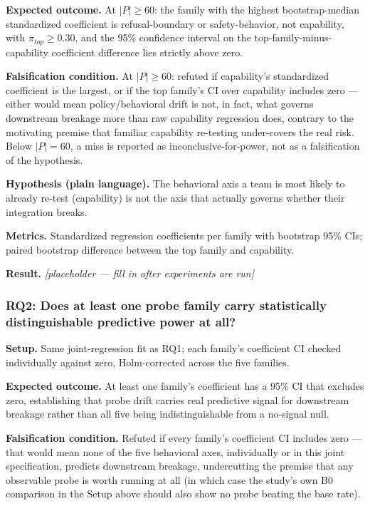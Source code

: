 \documentclass[11pt]{article}
\newcommand{\ph}{\textit{[placeholder --- fill in after experiments are run]}}
\begin{document}
\textbf{Expected outcome.} At $|P| \geq 60$: the family with the highest bootstrap-median standardized coefficient is refusal-boundary or safety-behavior, not capability, with $\pi_{top} \geq 0.30$, and the 95\% confidence interval on the top-family-minus-capability coefficient difference lies strictly above zero.

\textbf{Falsification condition.} At $|P| \geq 60$: refuted if capability's standardized coefficient is the largest, or if the top family's CI over capability includes zero --- either would mean policy/behavioral drift is not, in fact, what governs downstream breakage more than raw capability regression does, contrary to the motivating premise that familiar capability re-testing under-covers the real risk. Below $|P|=60$, a miss is reported as inconclusive-for-power, not as a falsification of the hypothesis.

\textbf{Hypothesis (plain language).} The behavioral axis a team is most likely to already re-test (capability) is not the axis that actually governs whether their integration breaks.

\textbf{Metrics.} Standardized regression coefficients per family with bootstrap 95\% CIs; paired bootstrap difference between the top family and capability.

\textbf{Result.} \ph

\subsubsection{RQ2: Does at least one probe family carry statistically distinguishable predictive power at all?}
\textbf{Setup.} Same joint-regression fit as RQ1; each family's coefficient CI checked individually against zero, Holm-corrected across the five families.

\textbf{Expected outcome.} At least one family's coefficient has a 95\% CI that excludes zero, establishing that probe drift carries real predictive signal for downstream breakage rather than all five being indistinguishable from a no-signal null.

\textbf{Falsification condition.} Refuted if every family's coefficient CI includes zero --- that would mean none of the five behavioral axes, individually or in this joint specification, predicts downstream breakage, undercutting the premise that any observable probe is worth running at all (in which case the study's own B0 comparison in the Setup above should also show no probe beating the base rate).
\end{document}
